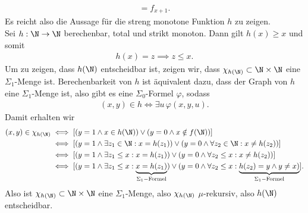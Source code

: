 \begin{solution}
\begin{enumerate}[label = Fall \arabic*:]
\begin{align*}
				= f_{x+1}.
			\end{align*}
			Es reicht also die Aussage für die streng monotone Funktion $h$ zu zeigen. \\
			Sei $h: \N \to \N$ berechenbar, total und strikt monoton. Dann gilt $h(x) \geq x$
			und somit
			\begin{align*}
				h(x) = z \implies z \leq x.
			\end{align*}
			Um zu zeigen, dass $h(\N)$ entscheidbar ist, zeigen wir, dass
			$\chi_{h(\N)} \subset \N \times \N$ eine $\Sigma_1$-Menge ist.
			Berechenbarkeit von $h$ ist äquivalent dazu, dass der Graph von $h$ eine
			$\Sigma_1$-Menge ist, also gibt es eine $\Sigma_0$-Formel $\varphi$, sodass
			\begin{align*}
				(x,y) \in h \iff \exists u\, \varphi(x,y,u).
			\end{align*}
			Damit erhalten wir
			\begin{align*}
				(x,y) \in \chi_{h(\N)} &\iff [(y = 1 \land x \in h(\N))
				\lor (y = 0 \land x \notin f(\N))] \\
				&\iff [(y = 1 \land \exists z_1 \in \N: x = h(z_1))
				\lor (y = 0 \land \forall z_2 \in \N: x \neq h(z_2))] \\
				&\iff [(y = 1 \land \exists z_1 \leq x: x = h(z_1))
				\lor (y = 0 \land \forall z_2 \leq x: x \neq h(z_2))] \\
				&\iff [(y = 1 \land \exists z_1 \leq x: \underbrace{x = h(z_1)}_{\Sigma_1-\text{Formel}})
				\lor (y = 0 \land \forall z_2 \leq x: \underbrace{h(z_2) = y \land y \neq x)}_{\Sigma_1-\text{Formel}}].
			\end{align*}
		Also ist $\chi_{h(\N)} \subset \N \times \N$ eine $\Sigma_1$-Menge, also
		$\chi_{h(\N)}$ $\mu$-rekursiv, also $h(\N)$ entscheidbar.
	\end{enumerate}

\end{solution}

